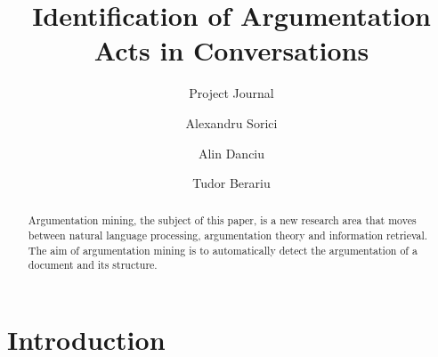 \documentclass[lnbip]{svmultln}
\begin{document}
%
\mainmatter              %
%
\title{Identification of Argumentation Acts in Conversations}
\subtitle{Project Journal}
%
%
\author{Alexandru Sorici \and Alin Danciu \and
Tudor Berariu}
%
%
%

\maketitle              %

\begin{abstract}        %
Argumentation mining, the subject of this paper, is a new research area that moves between natural language processing, argumentation theory and information retrieval. The aim of argumentation mining is to automatically detect the argumentation of a document and its structure.
\end{abstract}
%
\section{Introduction}
\end{document}
